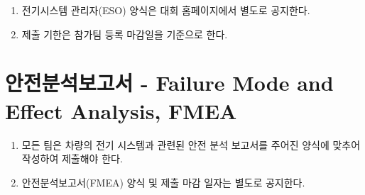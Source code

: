 \documentclass[final,a4paper,10pt]{report}
\begin{document}
\begin{enumerate}
  \item\label{rule:formula-technical.electrical-system-officer.form-announced-separately} 전기시스템 관리자(ESO) 양식은 대회 홈페이지에서 별도로 공지한다.
  \item\label{rule:formula-technical.electrical-system-officer.deadline-tied-to-registration} 제출 기한은 참가팀 등록 마감일을 기준으로 한다.
\end{enumerate}

\section{안전분석보고서 - Failure Mode and Effect Analysis, FMEA}\label{rule:formula-technical.fmea}
\begin{enumerate}
  \item\label{rule:formula-technical.fmea.submission-for-electrical-system} 모든 팀은 차량의 전기 시스템과 관련된 안전 분석 보고서를 주어진 양식에 맞추어 작성하여 제출해야 한다.
  \item\label{rule:formula-technical.fmea.form-and-deadline-announced} 안전분석보고서(FMEA) 양식 및 제출 마감 일자는 별도로 공지한다.
\end{enumerate}
\end{document}
